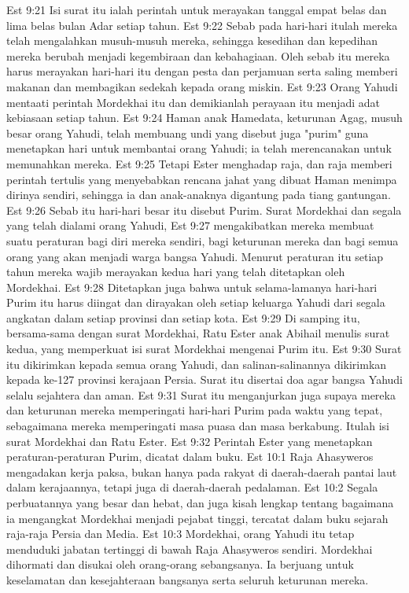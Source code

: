 Est 9:21  Isi surat itu ialah perintah untuk merayakan tanggal empat belas dan lima belas bulan Adar setiap tahun.
Est 9:22  Sebab pada hari-hari itulah mereka telah mengalahkan musuh-musuh mereka, sehingga kesedihan dan kepedihan mereka berubah menjadi kegembiraan dan kebahagiaan. Oleh sebab itu mereka harus merayakan hari-hari itu dengan pesta dan perjamuan serta saling memberi makanan dan membagikan sedekah kepada orang miskin.
Est 9:23  Orang Yahudi mentaati perintah Mordekhai itu dan demikianlah perayaan itu menjadi adat kebiasaan setiap tahun.
Est 9:24  Haman anak Hamedata, keturunan Agag, musuh besar orang Yahudi, telah membuang undi yang disebut juga "purim" guna menetapkan hari untuk membantai orang Yahudi; ia telah merencanakan untuk memunahkan mereka.
Est 9:25  Tetapi Ester menghadap raja, dan raja memberi perintah tertulis yang menyebabkan rencana jahat yang dibuat Haman menimpa dirinya sendiri, sehingga ia dan anak-anaknya digantung pada tiang gantungan.
Est 9:26  Sebab itu hari-hari besar itu disebut Purim. Surat Mordekhai dan segala yang telah dialami orang Yahudi,
Est 9:27  mengakibatkan mereka membuat suatu peraturan bagi diri mereka sendiri, bagi keturunan mereka dan bagi semua orang yang akan menjadi warga bangsa Yahudi. Menurut peraturan itu setiap tahun mereka wajib merayakan kedua hari yang telah ditetapkan oleh Mordekhai.
Est 9:28  Ditetapkan juga bahwa untuk selama-lamanya hari-hari Purim itu harus diingat dan dirayakan oleh setiap keluarga Yahudi dari segala angkatan dalam setiap provinsi dan setiap kota.
Est 9:29  Di samping itu, bersama-sama dengan surat Mordekhai, Ratu Ester anak Abihail menulis surat kedua, yang memperkuat isi surat Mordekhai mengenai Purim itu.
Est 9:30  Surat itu dikirimkan kepada semua orang Yahudi, dan salinan-salinannya dikirimkan kepada ke-127 provinsi kerajaan Persia. Surat itu disertai doa agar bangsa Yahudi selalu sejahtera dan aman.
Est 9:31  Surat itu menganjurkan juga supaya mereka dan keturunan mereka memperingati hari-hari Purim pada waktu yang tepat, sebagaimana mereka memperingati masa puasa dan masa berkabung. Itulah isi surat Mordekhai dan Ratu Ester.
Est 9:32  Perintah Ester yang menetapkan peraturan-peraturan Purim, dicatat dalam buku.
Est 10:1  Raja Ahasyweros mengadakan kerja paksa, bukan hanya pada rakyat di daerah-daerah pantai laut dalam kerajaannya, tetapi juga di daerah-daerah pedalaman.
Est 10:2  Segala perbuatannya yang besar dan hebat, dan juga kisah lengkap tentang bagaimana ia mengangkat Mordekhai menjadi pejabat tinggi, tercatat dalam buku sejarah raja-raja Persia dan Media.
Est 10:3  Mordekhai, orang Yahudi itu tetap menduduki jabatan tertinggi di bawah Raja Ahasyweros sendiri. Mordekhai dihormati dan disukai oleh orang-orang sebangsanya. Ia berjuang untuk keselamatan dan kesejahteraan bangsanya serta seluruh keturunan mereka.



